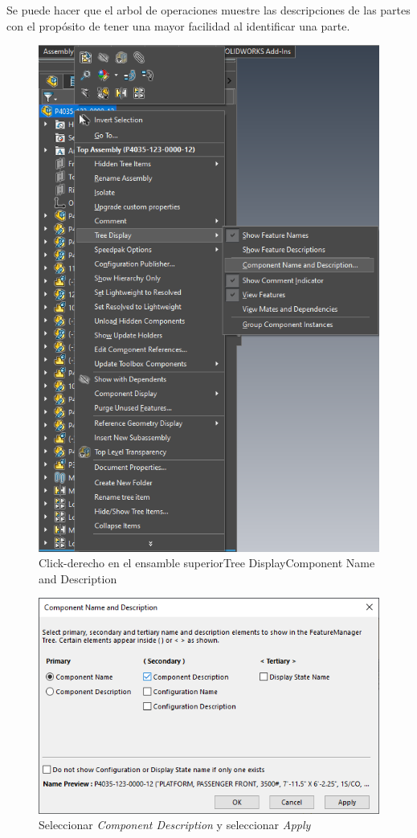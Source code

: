 \documentclass{report}
\begin{document}
Se puede hacer que el arbol de operaciones muestre las descripciones de las partes con el propósito de tener una mayor facilidad al identificar una parte.

\begin{figure}[H]
	\centering
	\includegraphics[width=0.85\linewidth, height=0.5\textheight,keepaspectratio]{Imagenes/solidworks_treedisplay01}
	\caption{Click-derecho en el ensamble superior\textrightarrow Tree Display\textrightarrow Component Name and Description}
	\label{fig:solidworkstreedisplay01}
\end{figure}

\begin{figure}[H]
	\centering
	\includegraphics[width=0.85\linewidth, height=0.5\textheight,keepaspectratio]{Imagenes/solidworks_treedisplay02}
	\caption{Seleccionar \emph{Component Description} y seleccionar \emph{Apply}}
	\label{fig:solidworkstreedisplay02}
\end{figure}
\end{document}
